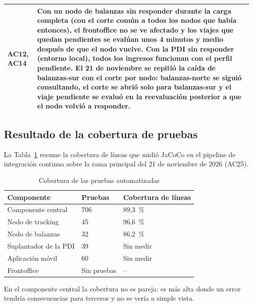 \begin{longtable}{|p{}|p{}|}
    \hline
    AC12, AC14 & Con un nodo de balanzas sin responder durante la carga completa (con el corte común a todos los nodos que había entonces), el frontoffice no se ve afectado y los viajes que quedan pendientes se evalúan unos 4 minutos y medio después de que el nodo vuelve. Con la PDI sin responder (entorno local), todos los ingresos funcionan con el perfil pendiente. El 21 de noviembre se repitió la caída de balanzas-sur con el corte por nodo: balanzas-norte se siguió consultando, el corte se abrió solo para balanzas-sur y el viaje pendiente se evaluó en la reevaluación posterior a que el nodo volvió a responder. \\
    \hline
\end{longtable}


\subsection{Resultado de la cobertura de pruebas}\label{sec:resultado-cobertura}

La Tabla~\ref{tab:resultado-cobertura} resume la cobertura de líneas que midió JaCoCo en el pipeline de integración continua sobre la rama principal del 21 de noviembre de 2026 (AC25).

\begin{table}[H]
    \centering
    \caption{Cobertura de las pruebas automatizadas}
    \label{tab:resultado-cobertura}
    \begin{tabular}{|p{6.8cm}|p{3.3cm}|p{5.4cm}|}
        \hline
            \textbf{Componente} & \textbf{Pruebas} & \textbf{Cobertura de líneas} \\
        \hline
            Componente central & 706 & 89,3~\% \\
        \hline
            Nodo de tracking & 45 & 96,6~\% \\
        \hline
            Nodo de balanzas & 32 & 86,2~\% \\
        \hline
            Suplantador de la PDI & 39 & Sin medir \\
        \hline
            Aplicación móvil & 60 & Sin medir \\
        \hline
            Frontoffice & Sin pruebas & -- \\
        \hline
    \end{tabular}
\end{table}

En el componente central la cobertura no es pareja: es más alta donde un error tendría consecuencias para terceros y no se vería a simple vista.

